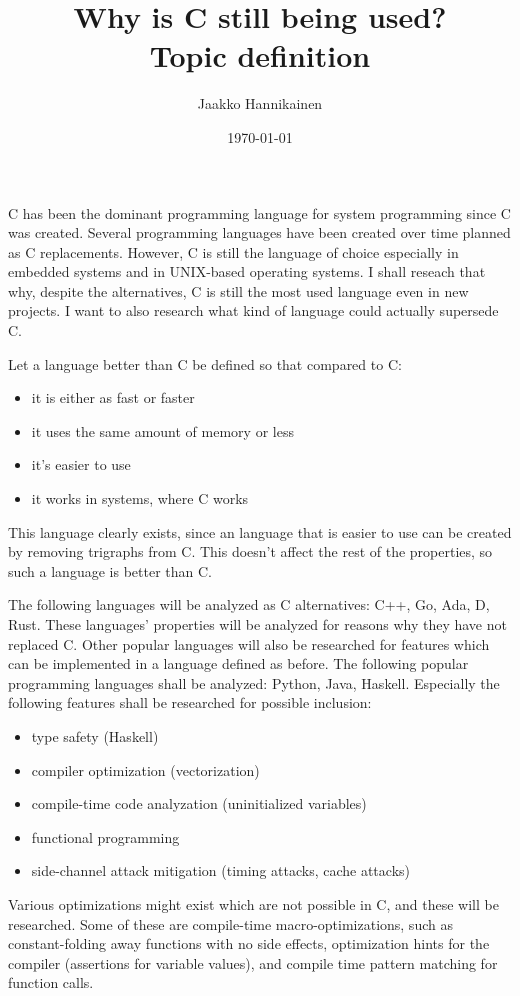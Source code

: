 \documentclass{article}
\title{Why is C still being used? \\ {\large Topic definition}}
\author{
    Jaakko Hannikainen
}
\date{\today}
\begin{document}
\maketitle

C has been the dominant programming language for system programming since C was
created. Several programming languages have been created over time planned as C
replacements. However, C is still the language of choice especially in embedded
systems and in UNIX-based operating systems. I shall reseach that why, despite
the alternatives, C is still the most used language even in new projects. I
want to also research what kind of language could actually supersede C.

Let a language better than C be defined so that compared to C:

\begin{itemize}
    \item it is either as fast or faster
    \item it uses the same amount of memory or less 
    \item it's easier to use 
    \item it works in systems, where C works
\end{itemize}

This language clearly exists, since an language that is easier to use can be
created by removing trigraphs from C. This doesn't affect the rest of the
properties, so such a language is better than C.

The following languages will be analyzed as C alternatives: C++, Go, Ada, D,
Rust. These languages' properties will be analyzed for reasons why they have
not replaced C. Other popular languages will also be researched for features
which can be implemented in a language defined as before. The following popular
programming languages shall be analyzed: Python, Java, Haskell. Especially the
following features shall be researched for possible inclusion:

\begin{itemize}
    \item type safety (Haskell)
    \item compiler optimization (vectorization)
    \item compile-time code analyzation (uninitialized variables)
    \item functional programming
    \item side-channel attack mitigation (timing attacks, cache attacks)
\end{itemize}

Various optimizations might exist which are not possible in C, and these will
be researched. Some of these are compile-time macro-optimizations, such as
constant-folding away functions with no side effects, optimization hints for
the compiler (assertions for variable values), and compile time pattern
matching for function calls.

\nocite{ADA12}
\nocite{C11}
\nocite{CPP14}
\nocite{D}
\nocite{golang}



\end{document}
